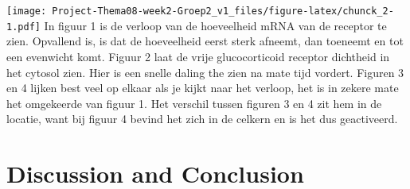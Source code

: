 \documentclass[
]{article}
\newenvironment{Shaded}{\begin{snugshade}}{\end{snugshade}}
\newcommand{\AttributeTok}[1]{\textcolor[rgb]{0.77,0.63,0.00}{#1}}
\newcommand{\DecValTok}[1]{\textcolor[rgb]{0.00,0.00,0.81}{#1}}
\newcommand{\FunctionTok}[1]{\textcolor[rgb]{0.00,0.00,0.00}{#1}}
\newcommand{\NormalTok}[1]{#1}
\newcommand{\SpecialCharTok}[1]{\textcolor[rgb]{0.00,0.00,0.00}{#1}}
\newcommand{\StringTok}[1]{\textcolor[rgb]{0.31,0.60,0.02}{#1}}
\begin{document}
\begin{Shaded}
\end{Shaded}

\texttt{[image: Project-Thema08-week2-Groep2\_v1\_files/figure-latex/chunck\_2-1.pdf]}
In figuur 1 is de verloop van de hoeveelheid mRNA van de receptor te
zien. Opvallend is, is dat de hoeveelheid eerst sterk afneemt, dan
toeneemt en tot een evenwicht komt. Figuur 2 laat de vrije
glucocorticoid receptor dichtheid in het cytosol zien. Hier is een
snelle daling the zien na mate tijd vordert. Figuren 3 en 4 lijken best
veel op elkaar als je kijkt naar het verloop, het is in zekere mate het
omgekeerde van figuur 1. Het verschil tussen figuren 3 en 4 zit hem in
de locatie, want bij figuur 4 bevind het zich in de celkern en is het
dus geactiveerd.

\hypertarget{discussion-and-conclusion}{%
\section{Discussion and Conclusion}\label{discussion-and-conclusion}}
\end{document}
